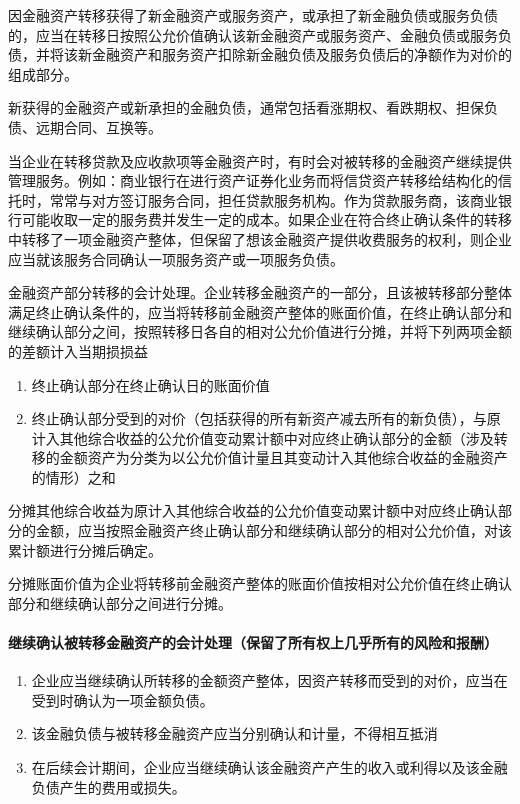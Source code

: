 \documentclass[UTF8,12pt]{ctexart}
\numberwithin{equation}{section} %
\numberwithin{figure}{section}
\numberwithin{table}{section}
\begin{document}
	因金融资产转移获得了新金融资产或服务资产，或承担了新金融负债或服务负债的，应当在转移日按照公允价值确认该新金融资产或服务资产、金融负债或服务负债，并将该新金融资产和服务资产扣除新金融负债及服务负债后的净额作为对价的组成部分。
	
	新获得的金融资产或新承担的金融负债，通常包括看涨期权、看跌期权、担保负债、远期合同、互换等。
	
	当企业在转移贷款及应收款项等金融资产时，有时会对被转移的金融资产继续提供管理服务。例如：商业银行在进行资产证券化业务而将信贷资产转移给结构化的信托时，常常与对方签订服务合同，担任贷款服务机构。作为贷款服务商，该商业银行可能收取一定的服务费并发生一定的成本。如果企业在符合终止确认条件的转移中转移了一项金融资产整体，但保留了想该金融资产提供收费服务的权利，则企业应当就该服务合同确认一项服务资产或一项服务负债。
	
	金融资产部分转移的会计处理。企业转移金融资产的一部分，且该被转移部分整体满足终止确认条件的，应当将转移前金融资产整体的账面价值，在终止确认部分和继续确认部分之间，按照转移日各自的相对公允价值进行分摊，并将下列两项金额的差额计入当期损损益
	\begin{enumerate}
		\item 终止确认部分在终止确认日的账面价值
		
		\item 终止确认部分受到的对价（包括获得的所有新资产减去所有的新负债），与原计入其他综合收益的公允价值变动累计额中对应终止确认部分的金额（涉及转移的金额资产为分类为以公允价值计量且其变动计入其他综合收益的金融资产的情形）之和
	\end{enumerate}

	分摊其他综合收益为原计入其他综合收益的公允价值变动累计额中对应终止确认部分的金额，应当按照金融资产终止确认部分和继续确认部分的相对公允价值，对该累计额进行分摊后确定。
	
	分摊账面价值为企业将转移前金融资产整体的账面价值按相对公允价值在终止确认部分和继续确认部分之间进行分摊。
	
	\paragraph{继续确认被转移金融资产的会计处理（保留了所有权上几乎所有的风险和报酬）}
	\begin{enumerate}
		\item 企业应当继续确认所转移的金额资产整体，因资产转移而受到的对价，应当在受到时确认为一项金额负债。
		
		\item 该金融负债与被转移金融资产应当分别确认和计量，不得相互抵消
		
		\item 在后续会计期间，企业应当继续确认该金融资产产生的收入或利得以及该金融负债产生的费用或损失。
	\end{enumerate}
\end{document}
